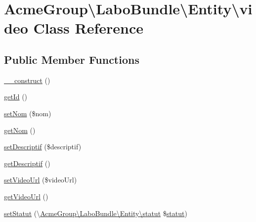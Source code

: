 \hypertarget{class_acme_group_1_1_labo_bundle_1_1_entity_1_1video}{\section{Acme\+Group\textbackslash{}Labo\+Bundle\textbackslash{}Entity\textbackslash{}video Class Reference}
\label{class_acme_group_1_1_labo_bundle_1_1_entity_1_1video}
}
\subsection*{Public Member Functions}
\begin{DoxyCompactItemize}
\item 
\hyperlink{class_acme_group_1_1_labo_bundle_1_1_entity_1_1video_adc9fed5c1aeede0e952c9bd86c36b363}{\+\_\+\+\_\+construct} ()
\item 
\hyperlink{class_acme_group_1_1_labo_bundle_1_1_entity_1_1video_afcebe273b97e69d880f0ead03c208279}{get\+Id} ()
\item 
\hyperlink{class_acme_group_1_1_labo_bundle_1_1_entity_1_1video_a997064be5815277a25b066b23394e241}{set\+Nom} (\$nom)
\item 
\hyperlink{class_acme_group_1_1_labo_bundle_1_1_entity_1_1video_a40d01c1817f197b0f9669653ad0f6c9a}{get\+Nom} ()
\item 
\hyperlink{class_acme_group_1_1_labo_bundle_1_1_entity_1_1video_a853f6f95276dbb52a66c1fc367ad790f}{set\+Descriptif} (\$descriptif)
\item 
\hyperlink{class_acme_group_1_1_labo_bundle_1_1_entity_1_1video_af29d8b4702433300f08c0c50b233a266}{get\+Descriptif} ()
\item 
\hyperlink{class_acme_group_1_1_labo_bundle_1_1_entity_1_1video_ad0b80ee3b8ceb70c3867d5283d219d74}{set\+Video\+Url} (\$video\+Url)
\item 
\hyperlink{class_acme_group_1_1_labo_bundle_1_1_entity_1_1video_ae16330563a0a8ffde70507598b5bb1c9}{get\+Video\+Url} ()
\item 
\hyperlink{class_acme_group_1_1_labo_bundle_1_1_entity_1_1video_aaf5a10fc9e50b5c6b6b6a2595c943e03}{set\+Statut} (\textbackslash{}\hyperlink{class_acme_group_1_1_labo_bundle_1_1_entity_1_1statut}{Acme\+Group\textbackslash{}\+Labo\+Bundle\textbackslash{}\+Entity\textbackslash{}statut} \$\hyperlink{class_acme_group_1_1_labo_bundle_1_1_entity_1_1statut}{statut})
\item 

\end{DoxyCompactItemize}
